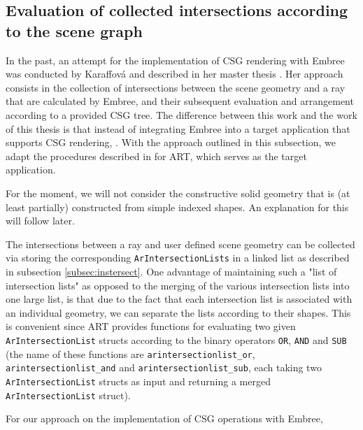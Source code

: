 \subsection{Evaluation of collected intersections according to the scene graph}
\label{subsec:apprach1}

In the past, an attempt for the implementation of CSG rendering with Embree was conducted by Karaffová and described in her master thesis \cite{karaffova2016}. Her approach consists in the collection of intersections between the scene geometry and a ray that are calculated by Embree, and their subsequent evaluation and arrangement according to a provided CSG tree. The difference between this work and the work of this thesis is that instead of integrating Embree into a target application that supports CSG rendering,  .
With the approach outlined in this subsection, we adapt the procedures described in \cite{karaffova2016} for ART, which serves as the target application. 

For the moment, we will not consider the constructive solid geometry that is (at least partially) constructed from simple indexed shapes. An explanation for this will follow later.

The intersections between a ray and user defined scene geometry can be collected via storing the corresponding \texttt{ArIntersectionLists} in a linked list as described in subsection \ref{subsec:instersect}. One advantage of maintaining such a "list of intersection lists" as opposed to the merging of the various intersection lists into one large list, is that due to the fact that each intersection list is associated with an individual geometry, we can separate the lists according to their shapes. This is convenient since ART provides functions for evaluating two given \texttt{ArIntersectionList} structs according to the binary operators \texttt{OR}, \texttt{AND} and \texttt{SUB} (the name of these functions are \texttt{arintersectionlist\_or}, \texttt{arintersectionlist\_and} and \texttt{arintersectionlist\_sub}, each taking two \texttt{ArIntersectionList} structs as input and returning a merged \texttt{ArIntersectionList} struct).

For our approach on the implementation of CSG operations with Embree, 

